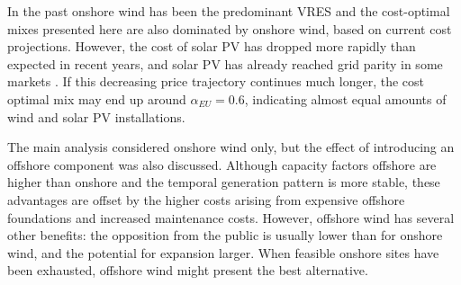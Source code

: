 \documentclass[a4paper, 5p, sort&compress]{elsarticle}%
\begin{document}
In the past onshore wind has been the predominant VRES and the
cost-optimal mixes presented here are also dominated by onshore wind,
based on current cost projections.  However, the cost of solar PV has
dropped more rapidly than expected in recent years, and solar PV has
already reached grid parity in some markets \cite{solarGridParity}. If
this decreasing price trajectory continues much longer, the cost
optimal mix may end up around $\alpha_{EU} = 0.6$,
indicating almost equal amounts of wind and solar PV installations.




The main analysis considered onshore wind only, but the effect of
introducing an offshore component was also discussed. Although
capacity factors offshore are higher than onshore and the temporal
generation pattern is more stable, these advantages are offset by the
higher costs arising from expensive offshore foundations and increased
maintenance costs. However, offshore wind has several other benefits:
the opposition from the public is usually lower than for onshore wind,
and the potential for expansion larger. When feasible onshore sites
have been exhausted, offshore wind might present the best alternative.
\end{document}
